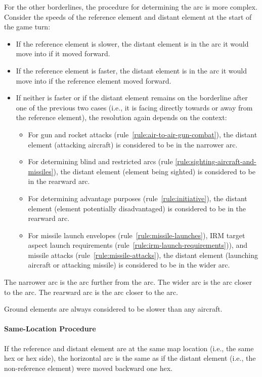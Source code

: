 {For the other borderlines, the procedure for determining the arc is more complex. Consider the speeds of the reference element and distant element at the start of the game turn:
\begin{itemize}
\item If the reference element is slower, the distant element is in the arc it would move into if it moved forward.
\item If the reference element is faster, the distant element is in the arc it would move into if the reference element moved forward.
\item If neither is faster or if the distant element remains on the borderline after one of the previous two cases (i.e., it is facing directly towards or away from the reference element), the resolution again depends on the context:
\begin{itemize}
\item For gun and rocket attacks (rule~\ref{rule:air-to-air-gun-combat}), the distant element (attacking aircraft) is considered to be in the narrower arc.
\item For determining blind and restricted arcs (rule \ref{rule:sighting-aircraft-and-missiles}), the distant element (element being sighted) is considered to be in the rearward arc.
\item For determining advantage purposes (rule~\ref{rule:initiative}), the distant element (element potentially disadvantaged) is considered to be in the rearward arc.
\item For missile launch envelopes (rule~\ref{rule:missile-launches}), IRM target aspect launch requirements (rule~\ref{rule:irm-launch-requirements})), and missile attacks (rule~\ref{rule:missile-attacks}), the distant element (launching aircraft or attacking missile) is considered to be in the wider arc.
\end{itemize}
\end{itemize}

The narrower arc is the arc further from the  arc. The wider arc is the arc closer to the  arc. The rearward arc is the arc closer to the  arc.

Ground elements are always considered to be slower than any aircraft.

\paragraph{Same-Location Procedure}
If the reference and distant element are at the same map location (i.e., the same hex or hex side), the horizontal arc is the same as if the distant element (i.e., the non-reference element) were moved backward one hex.

}
